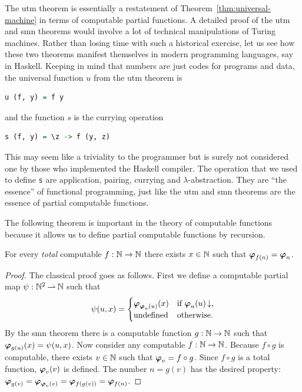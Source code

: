 \noindent
The utm theorem is essentially a restatement of
Theorem~\ref{thm:universal-machine} in terms of computable partial
functions. A detailed proof of the utm and smn theorems would involve
a lot of technical manipulations of Turing machines. Rather than
losing time with such a historical exercise, let us see how these two
theorems manifest themselves in modern programming languages, say in
Haskell. Keeping in mind that numbers are just codes for programs and
data, the universal function $u$ from the utm theorem is
%
\begin{lstlisting}[language=Haskell]
u (f, y) = f y
\end{lstlisting}
%
and the function $s$ is the currying operation
%
\begin{lstlisting}[language=Haskell]
s (f, y) = \z -> f (y, z)
\end{lstlisting}
%
This may seem like a triviality to the programmer but is surely not
considered one by those who implemented the Haskell compiler. The
operation that we used to define \lstinline!s! are application,
pairing, currying and $\lambda$-abstraction. They are ``the essence''
of functional programming, just like the utm and smn theorems are the
essence of partial computable functions.

The following theorem is important in the theory of computable
functions because it allows us to define partial computable functions
by recursion.

\begin{theorem}
  For every \emph{total} computable $f : \mathbb{N} \to \mathbb{N}$ there exists $x
  \in \mathbb{N}$ such that $\text{\boldmath{$\varphi$}}_{f(n)} = \text{\boldmath{$\varphi$}}_{n}$.
\end{theorem}

\begin{proof}
  The classical proof goes as follows. First we define a computable
  partial map $\psi : \mathbb{N}^2 \mathbin{\rightharpoonup} \mathbb{N}$ such that
  \begin{equation*}
    \psi(u, x) =
    \begin{cases}
      \text{\boldmath{$\varphi$}}_{\text{\boldmath{$\varphi$}}_{u}(u)}(x) & \text{if $\text{\boldmath{$\varphi$}}_{u}(u)\,{\downarrow}$,}\\
      \text{undefined}  & \text{otherwise.}\\
    \end{cases}
  \end{equation*}
  By the smn theorem there is a computable function $g : \mathbb{N} \to \mathbb{N}$
  such that $\text{\boldmath{$\varphi$}}_{g(u)}(x) = \psi(u, x)$. Now consider any computable
  $f : \mathbb{N} \to \mathbb{N}$. Because $f \circ g$ is computable, there exists
  $v \in \mathbb{N}$ such that $\text{\boldmath{$\varphi$}}_{v} = f \circ g$. Since $f \circ g$ is a
  total function, $\text{\boldmath{$\varphi$}}_{v}(v)$ is defined. The number $n = g(v)$ has
  the desired property:
  $\text{\boldmath{$\varphi$}}_{g(v)} = \text{\boldmath{$\varphi$}}_{\text{\boldmath{$\varphi$}}_{v}(v)} = \text{\boldmath{$\varphi$}}_{f(g(v))} = \text{\boldmath{$\varphi$}}_{f(n)}$.
\end{proof}

